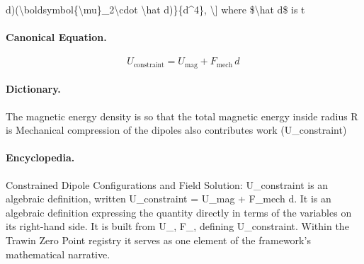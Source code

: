 d)(\textbackslash{}boldsymbol\{\textbackslash{}mu\}\_2\textbackslash{}cdot \textbackslash{}hat d)\}\{d\textasciicircum{}4\}, \textbackslash{}] where \$\textbackslash{}hat d\$ is t

\paragraph{Canonical Equation.}
\[
U_{\mathrm{constraint}} = U_{\mathrm{mag}} + F_{\mathrm{mech}}\,d\,
\]

\paragraph{Dictionary.}
The magnetic energy density is so that the total magnetic energy inside radius R is Mechanical compression of the dipoles also contributes work (U\_constraint)

\paragraph{Encyclopedia.}
Constrained Dipole Configurations and Field Solution: U\_constraint is an algebraic definition, written U\_constraint = U\_mag + F\_mech d. It is an algebraic definition expressing the quantity directly in terms of the variables on its right-hand side. It is built from U\_, F\_, defining U\_constraint. Within the Trawin Zero Point registry it serves as one element of the framework's mathematical narrative.
